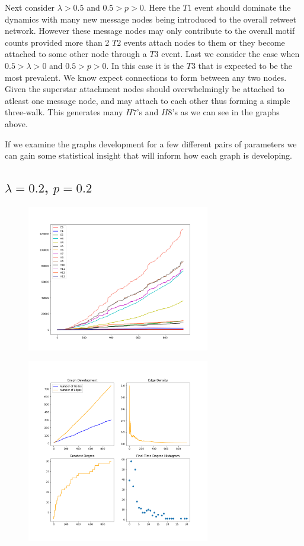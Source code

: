 \vspace{3mm}
Next consider $\lambda>0.5$ and $0.5>p>0$. Here the $T1$ event should dominate the dynamics 
with many new message nodes being introduced to the overall retweet network. However these
message nodes may only contribute to the overall motif counts provided more than 2 $T2$  events
attach nodes to them or they become attached to some other node through a $T3$ event.
Last we consider the case when $0.5>\lambda>0$ and $0.5>p>0$. In this case it is the $T3$ 
that is expected to be the most prevalent. We know expect connections to form between any two nodes. Given
the superstar attachment nodes should overwhelmingly be attached to atleast one message node, and may attach 
to each other thus forming a simple three-walk. This generates many $H7$'s and $H8$'s as we can
see in the graphs above.

\vspace{3mm}

If we examine the graphs development for a few different pairs of parameters we can gain some statistical insight that
will inform how each graph is developing.

\subsection*{$\lambda=0.2$, $p=0.2$}

\begin{figure}[h!]
    \includegraphics[width=8cm]{Images/twitter_sim_for_stats_3_0.2_0.2.png}
    \centering
\end{figure}

\begin{figure}[h!]
    \includegraphics[width=8cm]{Images/twitter_sim_stats_3_0.2_0.2.png}
    \centering
\end{figure}

